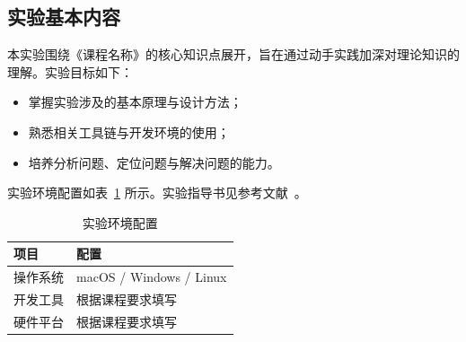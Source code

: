\subsection{实验基本内容}

本实验围绕《课程名称》的核心知识点展开，旨在通过动手实践加深对理论知识的理解。实验目标如下：

\begin{itemize}
    \item 掌握实验涉及的基本原理与设计方法；
    \item 熟悉相关工具链与开发环境的使用；
    \item 培养分析问题、定位问题与解决问题的能力。
\end{itemize}

实验环境配置如表~\ref{tab:env} 所示。实验指导书见参考文献~\cite{yuan2015computer}。

\begin{table}[htbp]
    \centering
    \caption{实验环境配置}
    \label{tab:env}
    \begin{tabularx}{0.8\textwidth}{lX}
        \toprule
        \textbf{项目} & \textbf{配置} \\
        \midrule
        操作系统 & macOS / Windows / Linux \\
        开发工具 & 根据课程要求填写 \\
        硬件平台 & 根据课程要求填写 \\
        \bottomrule
    \end{tabularx}
\end{table}